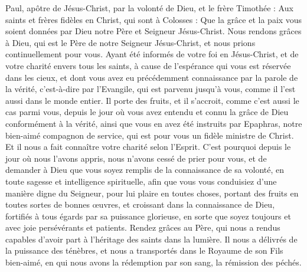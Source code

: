 \BFont
\begin{multicols}{2}
\TextTitle{[Introduction]}
\VerseOne{}Paul, apôtre de Jésus-Christ, par la volonté de Dieu, et le frère Timothée :
Aux saints et frères fidèles en Christ, qui sont à Colosses : Que la grâce et la paix vous soient données par Dieu notre Père et Seigneur Jésus-Christ.
Nous rendons grâces à Dieu, qui est le Père de notre Seigneur Jésus-Christ, et nous prions continuellement pour vous.
Ayant été informés de votre foi en Jésus-Christ, et de votre charité envers tous les saints,
à cause de l'espérance qui vous est réservée dans les cieux, et dont vous avez eu précédemment connaissance par la parole de la vérité, c'est-à-dire par l'Evangile,
qui est parvenu jusqu'à vous, comme il l'est aussi dans le monde entier. Il porte des fruits, et il s’accroit, comme c’est aussi le cas parmi vous, depuis le jour où vous avez entendu et connu la grâce de Dieu conformément à la vérité,
ainsi que vous en avez été instruits par Epaphras, notre bien-aimé compagnon de service, qui est pour vous un fidèle ministre de Christ.
Et il nous a fait connaître votre charité selon l’Esprit.
C'est pourquoi depuis le jour où nous l’avons appris, nous n’avons cessé de prier pour vous, et de demander à Dieu que vous soyez remplis de la connaissance de sa volonté, en toute sagesse et intelligence spirituelle,
afin que vous vous conduisiez d’une manière digne du Seigneur, pour lui plaire en toutes choses, portant des fruits en toutes sortes de bonnes œuvres, et croissant dans la connaissance de Dieu,
fortifiés à tous égards par sa puissance glorieuse, en sorte que soyez toujours et avec joie persévérants et patients.
Rendez grâces au Père, qui nous a rendus capables d’avoir part à l'héritage des saints dans la lumière.
Il nous a délivrés de la puissance des ténèbres, et nous a transportés dans le Royaume de son Fils bien-aimé,
en qui nous avons la rédemption par son sang, la rémission des péchés.

\end{multicols}
